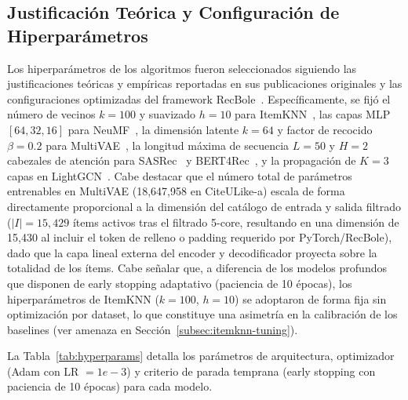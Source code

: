 \documentclass[journal]{IEEEtran}
\begin{document}
\subsection{Justificación Teórica y Configuración de Hiperparámetros}
Los hiperparámetros de los algoritmos fueron seleccionados siguiendo las justificaciones teóricas y empíricas reportadas en sus publicaciones originales y las configuraciones optimizadas del framework RecBole~\cite{zhao2021recbole}. Específicamente, se fijó el número de vecinos $k=100$ y suavizado $h=10$ para ItemKNN~\cite{sarwar2001item}, las capas MLP $[64, 32, 16]$ para NeuMF~\cite{he2017neural}, la dimensión latente $k=64$ y factor de recocido $\beta=0.2$ para MultiVAE~\cite{liang2018variational}, la longitud máxima de secuencia $L=50$ y $H=2$ cabezales de atención para SASRec~\cite{kang2018self} y BERT4Rec~\cite{sun2019bert4rec}, y la propagación de $K=3$ capas en LightGCN~\cite{he2020lightgcn}. Cabe destacar que el número total de parámetros entrenables en MultiVAE (18,647,958 en CiteULike-a) escala de forma directamente proporcional a la dimensión del catálogo de entrada y salida filtrado ($|I| = 15,429$ ítems activos tras el filtrado 5-core, resultando en una dimensión de 15,430 al incluir el token de relleno o padding requerido por PyTorch/RecBole), dado que la capa lineal externa del encoder y decodificador proyecta sobre la totalidad de los ítems. Cabe señalar que, a diferencia de los modelos profundos que disponen de early stopping adaptativo (paciencia de 10 épocas), los hiperparámetros de ItemKNN ($k=100$, $h=10$) se adoptaron de forma fija sin optimización por dataset, lo que constituye una asimetría en la calibración de los baselines (ver amenaza en Sección~\ref{subsec:itemknn-tuning}).

La Tabla~\ref{tab:hyperparams} detalla los parámetros de arquitectura, optimizador (Adam con LR $= 1e-3$) y criterio de parada temprana (early stopping con paciencia de 10 épocas) para cada modelo.
\end{document}
